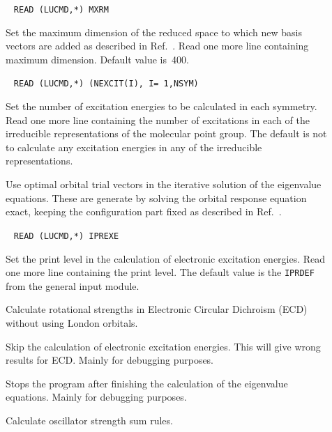 \begin{description}
\item[]\verb| |\newline
\verb|READ (LUCMD,*) MXRM|

Set the maximum dimension of the reduced space to which new basis
vectors are added as described in Ref.~\cite{tuhjahjajpjjcp84}. Read
one more line containing maximum dimension. Default value is~400.

\item[]\verb| |\newline
\verb|READ (LUCMD,*) (NEXCIT(I), I= 1,NSYM)|

Set the number of excitation energies to be
calculated in each 
symmetry. Read one more line containing the number of excitations in
each of the irreducible representations of the molecular point group.
The default is not to calculate any excitation energies in any of the
irreducible representations.

\item[] Use optimal orbital trial vectors in the
iterative solution of the eigenvalue equations.
These are generate by solving the orbital response equation
exact, keeping the configuration part fixed as described in
Ref.~\cite{tuhjahjajpjjcp84}. 

\item[]\verb| |\newline
\verb|READ (LUCMD,*) IPREXE|

Set the print level in the calculation of electronic excitation
energies. Read one more line containing the print level.
The default value is the \verb|IPRDEF| from the general input module.

\item[] Calculate rotational strengths in Electronic
Circular Dichroism (ECD) without using London orbitals.

\item[] Skip the calculation of electronic excitation
energies. This will give wrong results for ECD.
Mainly for debugging purposes.

\item[] Stops the program after finishing the 
calculation of the eigenvalue equations. Mainly
for debugging purposes. 

\item[] Calculate oscillator strength sum rules.


\end{description}
